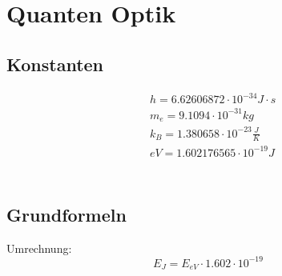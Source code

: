 



\chapter{Quanten Optik}
\section{Konstanten}
\[
\boxed{\begin{aligned}	
		&h = 6.62606872\cdot 10^{-34} J\cdot s \\
		&m_e = 9.1094\cdot 10^{-31}kg \\
		&k_B = 1.380658 \cdot 10^{-23} \frac{J}{K}\\
		&eV = 1.602176565 \cdot 10^{-19}J\\
	\end{aligned}}	\]
\\
\section{Grundformeln}
Umrechnung:
\[
	E_J = E_{eV} \cdot 1.602\cdot 10^{-19}
\]
\\
